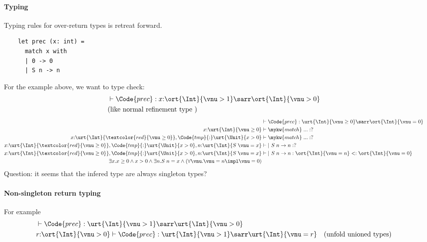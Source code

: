 \paragraph{Typing} Typing rules for over-return types is retreat forward.
\begin{verbatim}
    let prec (x: int) =
      match x with
      | 0 -> 0
      | S n -> n
\end{verbatim}
For the example above, we want to type check:
\begin{align*}
    &\vdash \Code{prec} : x{:}\ort{\Int}{\vnu > 1} \sarr \ort{\Int}{\vnu > 0} \\
    &(\text{like normal refinement type })
\end{align*}\noindent
\begin{align*}
    &\vdash \Code{prec} : \urt{\Int}{\vnu \geq 0} \sarr \ort{\Int}{\vnu = 0} \\
    x{:}\urt{\Int}{\vnu \geq 0} &\vdash \mykw{match}\; ... : ? \\
    x{:}\urt{\Int}{\textcolor{red}{\vnu \geq 0}}, \Code{tmp}{:}\urt{\Unit}{x > 0} &\vdash \mykw{match}\;... : ? \\
    x{:}\urt{\Int}{\textcolor{red}{\vnu \geq 0}}, \Code{tmp}{:}\urt{\Unit}{x > 0}, n{:}\urt{\Int}{S\;\vnu = x} &\vdash |~ S\;n \to n : ? \\
    x{:}\urt{\Int}{\textcolor{red}{\vnu \geq 0}}, \Code{tmp}{:}\urt{\Unit}{x > 0}, n{:}\urt{\Int}{S\;\vnu = x} &\vdash |~ S\;n \to n : \ort{\Int}{\vnu = n} <: \ort{\Int}{\vnu = 0} \\
    \exists x. x \geq 0 \land x > 0 \land \exists n. S\;n = x \land (\forall \vnu. \vnu = n \impl \vnu = 0)
\end{align*}\noindent
Question: it seems that the infered type are always singleton types?

\paragraph{Non-singleton return typing} For example
\begin{align*}
    &\vdash \Code{prec} : \urt{\Int}{\vnu > 1} \sarr \urt{\Int}{\vnu > 0} \\
    &r{:}\ort{\Int}{\vnu > 0} \vdash \Code{prec} : \urt{\Int}{\vnu > 1} \sarr \urt{\Int}{\vnu = r} \quad (\text{unfold unioned types}) \\
\end{align*}\noindent

